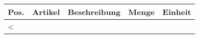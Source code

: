 \renewcommand{\arraystretch}{1.2} %

\begin{tabularx}{\textwidth}{@{}llXrr@{}}

\hline

\textbf{Pos.} & \textbf{Artikel} & \textbf{Beschreibung} & \textbf{Menge} & \textbf{Einheit} \\

\hline

<%
\IfSubStr{<%
\ifthenelse{\equal{<%
\ifthenelse{\equal{<%
\ifthenelse{\equal{<%
\ifthenelse{\equal{<%
\ifthenelse{\equal{<%
\ifthenelse{\equal{<%
\ifthenelse{\equal{<%
\ifthenelse{\equal{<%
& \IfSubStr{<%
<%
\end{tabularx}
\hline